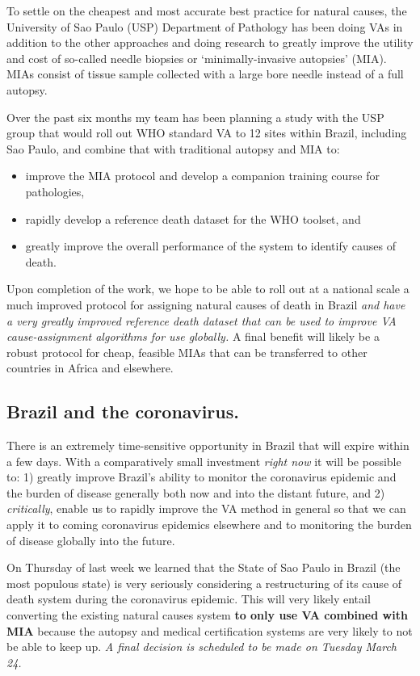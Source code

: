 \documentclass[12pt]{article}
\begin{document}
To settle on the cheapest and most accurate best practice for natural causes, the University of Sao Paulo (USP) Department of Pathology has been doing VAs in addition to the other approaches and doing research to greatly improve the utility and cost of so-called needle biopsies or `minimally-invasive autopsies' (MIA).  MIAs consist of tissue sample collected with a large bore needle instead of a full autopsy.

Over the past six months my team has been planning a study with the USP group that would roll out WHO standard VA to 12 sites within Brazil, including Sao Paulo, and combine that with traditional autopsy and MIA to:
\begin{itemize}
\item improve the MIA protocol and develop a companion training course for pathologies,
\item rapidly develop a reference death dataset for the WHO toolset, and
\item greatly improve the overall performance of the system to identify causes of death.
\end{itemize}
Upon completion of the work, we hope to be able to roll out at a national scale a much improved protocol for assigning natural causes of death in Brazil \textit{and have a very greatly improved reference death dataset that can be used to improve VA cause-assignment algorithms for use globally.}  A final benefit will likely be a robust protocol for cheap, feasible MIAs that can be transferred to other countries in Africa and elsewhere.

\subsection{Brazil and the coronavirus.}

There is an extremely time-sensitive opportunity in Brazil that will expire within a few days.  With a comparatively small investment \textit{right now} it will be possible to: 1) greatly improve Brazil's ability to monitor the coronavirus epidemic and the burden of disease generally both now and into the distant future, and 2) \textit{critically}, enable us to rapidly improve the VA method in general so that we can apply it to coming coronavirus epidemics elsewhere and to monitoring the burden of disease globally into the future.  

On Thursday of last week we learned that the State of Sao Paulo in Brazil (the most populous state) is very seriously considering a restructuring of its cause of death system during the coronavirus epidemic.  This will very likely entail converting the existing natural causes system \textbf{to only use VA combined with MIA} because the autopsy and medical certification systems are very likely to not be able to keep up.  \textit{A final decision is scheduled to be made on Tuesday March 24.}  
\end{document}
